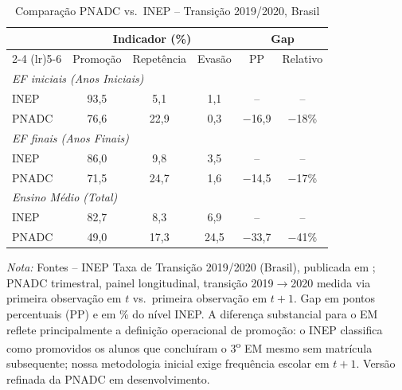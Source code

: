 \begin{table}[htbp]
\centering
\caption{Comparação PNADC vs.\ INEP -- Transição 2019/2020, Brasil}
\label{tab:t4_pnadc_inep}
\begin{threeparttable}
\small
\begin{tabular}{lccccc}
\toprule
                       & \multicolumn{3}{c}{Indicador (\%)} & \multicolumn{2}{c}{Gap} \\
\cmidrule(lr){2-4} \cmidrule(lr){5-6}
                       & Promoção & Repetência & Evasão & PP & Relativo \\
\midrule
\multicolumn{6}{l}{\textit{EF iniciais (Anos Iniciais)}} \\
INEP                   & 93,5 & 5,1 & 1,1  & --   & --    \\
PNADC                  & 76,6 & 22,9 & 0,3 & $-$16,9 & $-$18\% \\
\midrule
\multicolumn{6}{l}{\textit{EF finais (Anos Finais)}} \\
INEP                   & 86,0 & 9,8 & 3,5  & --   & --    \\
PNADC                  & 71,5 & 24,7 & 1,6 & $-$14,5 & $-$17\% \\
\midrule
\multicolumn{6}{l}{\textit{Ensino Médio (Total)}} \\
INEP                   & 82,7 & 8,3 & 6,9  & --   & --    \\
PNADC                  & 49,0 & 17,3 & 24,5 & $-$33,7 & $-$41\% \\
\bottomrule
\end{tabular}
\begin{tablenotes}
\footnotesize
\item \textit{Nota:} Fontes -- INEP Taxa de Transição 2019/2020 (Brasil),
publicada em \citet{INEP_transicao}; PNADC trimestral, painel longitudinal,
transição 2019$\to$2020 medida via primeira observação em $t$ vs.\ primeira
observação em $t+1$. Gap em pontos percentuais (PP) e em \% do nível INEP.
A diferença substancial para o EM reflete principalmente a definição
operacional de promoção: o INEP classifica como promovidos os alunos que
concluíram o 3\textsuperscript{o} EM mesmo sem matrícula subsequente;
nossa metodologia inicial exige frequência escolar em $t+1$. Versão refinada
da PNADC em desenvolvimento.
\end{tablenotes}
\end{threeparttable}
\end{table}
